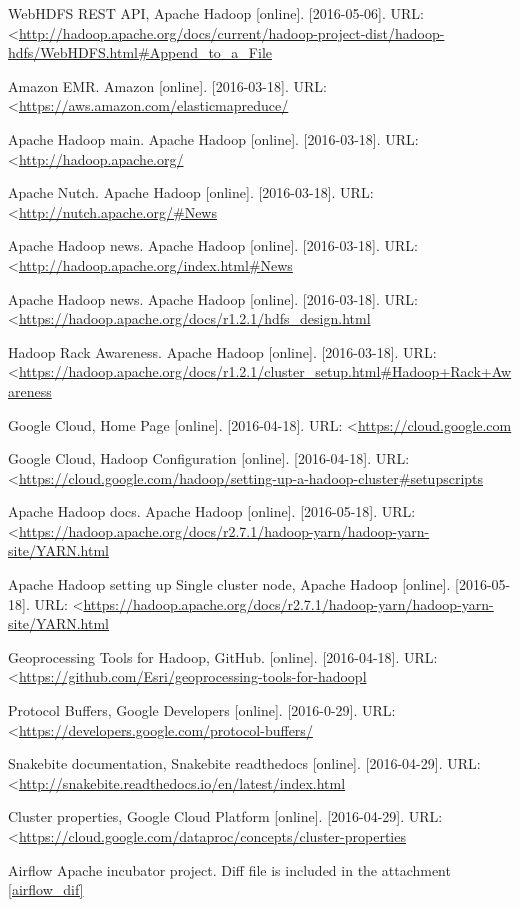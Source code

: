 \documentclass[a4paper,12pt,oneside]{report}
\begin{document}
\begin{thebibliography}{99}
WebHDFS REST API, Apache Hadoop  [online]. [2016-05-06]. URL:  \textless\url{http://hadoop.apache.org/docs/current/hadoop-project-dist/hadoop-hdfs/WebHDFS.html#Append_to_a_File
}

Amazon EMR. Amazon [online]. [2016-03-18]. 
URL: \textless\url{https://aws.amazon.com/elasticmapreduce/}

Apache Hadoop main. Apache Hadoop [online]. [2016-03-18]. 
URL: \textless\url{http://hadoop.apache.org/}

Apache Nutch. Apache Hadoop [online]. [2016-03-18]. 
URL: \textless\url{http://nutch.apache.org/#News
}

Apache Hadoop news. Apache Hadoop [online]. [2016-03-18]. 
URL: \textless\url{http://hadoop.apache.org/index.html#News}


Apache Hadoop news. Apache Hadoop [online]. [2016-03-18]. 
URL: \textless\url{https://hadoop.apache.org/docs/r1.2.1/hdfs_design.html}


Hadoop Rack Awareness. Apache Hadoop [online]. [2016-03-18]. 
URL: \textless\url{https://hadoop.apache.org/docs/r1.2.1/cluster_setup.html#Hadoop+Rack+Awareness}

Google Cloud, Home Page [online]. [2016-04-18]. 
URL: \textless\url{https://cloud.google.com}


Google Cloud, Hadoop Configuration [online]. [2016-04-18]. 
URL: \textless\url{https://cloud.google.com/hadoop/setting-up-a-hadoop-cluster#setupscripts}

Apache Hadoop docs. Apache Hadoop [online]. [2016-05-18]. 
URL: \textless\url{https://hadoop.apache.org/docs/r2.7.1/hadoop-yarn/hadoop-yarn-site/YARN.html}

Apache Hadoop setting up Single cluster node, Apache Hadoop [online]. [2016-05-18]. 
URL: \textless\url{https://hadoop.apache.org/docs/r2.7.1/hadoop-yarn/hadoop-yarn-site/YARN.html}


Geoprocessing Tools for Hadoop, GitHub. [online]. [2016-04-18]. 
URL: \textless\url{https://github.com/Esri/geoprocessing-tools-for-hadoopl}

Protocol Buffers, Google Developers [online]. [2016-0-29]. 
URL: \textless\url{https://developers.google.com/protocol-buffers/}

Snakebite documentation, Snakebite readthedocs [online]. [2016-04-29]. 
URL: \textless\url{http://snakebite.readthedocs.io/en/latest/index.html}

Cluster properties, Google Cloud Platform [online]. [2016-04-29]. 
URL: \textless\url{https://cloud.google.com/dataproc/concepts/cluster-properties}


Airflow Apache incubator project. Diff file is included in the attachment \ref{airflow_dif}




\end{thebibliography}
\end{document}
